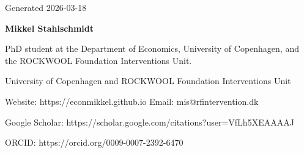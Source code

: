 \documentclass[10pt]{article}
\begin{document}
{\sffamily\footnotesize Generated 2026-03-18\par}
{\sffamily\bfseries\fontsize{24}{26}\selectfont\color{accent} Mikkel Stahlschmidt\par}
PhD student at the Department of Economics, University of Copenhagen, and the ROCKWOOL Foundation Interventions Unit.\par
University of Copenhagen and ROCKWOOL Foundation Interventions Unit\par

{\sffamily\footnotesize Website: https://econmikkel.github.io \hfill Email: mis@rfintervention.dk\par}
{\sffamily\footnotesize Google Scholar: https://scholar.google.com/citations?user=VfLh5XEAAAAJ\par}
{\sffamily\footnotesize ORCID: https://orcid.org/0009-0007-2392-6470\par}

\vspace{0.5em}
\end{document}
